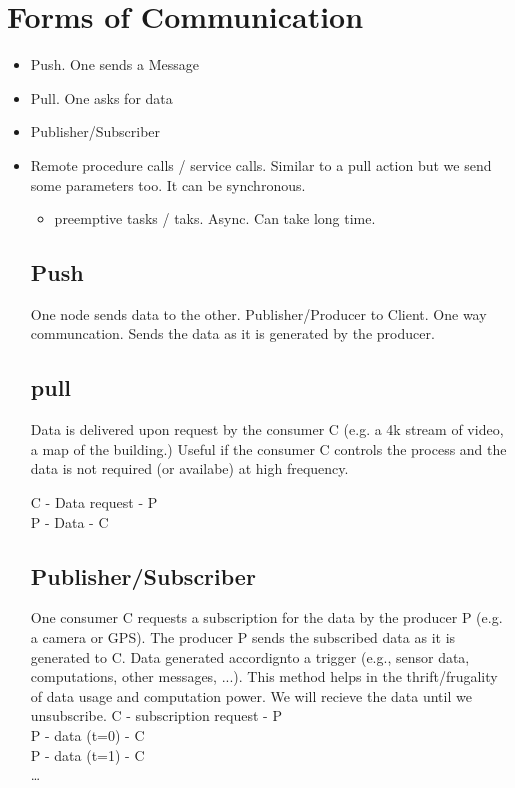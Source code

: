 \documentclass[]{report}
\begin{document}
\section*{Forms of Communication}
    \begin{itemize}
        \item Push. One sends a Message
        \item Pull. One asks for data
        \item Publisher/Subscriber
        \item Remote procedure calls / service calls. Similar to a pull action but we send some parameters too. It can be synchronous.
        \begin{itemize}
            \item  preemptive tasks / taks. Async. Can take long time.
        \end{itemize}
        \subsection*{Push}
        One node sends data to the other. Publisher/Producer to Client. One way communcation. Sends the data as it is generated by the producer.
        \subsection*{pull}
        Data is delivered upon request by the consumer C (e.g. a 4k stream of video, a map of the building.)
        Useful if the consumer C controls the process and the data is not required (or availabe) at high frequency.

        C - Data request - P \\
        P - Data - C

        \subsection*{Publisher/Subscriber}
        One consumer C requests a subscription for the data by the producer P (e.g. a camera or GPS). The producer P sends the subscribed data as it is generated to C.
        Data generated accordignto a trigger (e.g., sensor data, computations, other messages, ...). This method helps in the thrift/frugality of data usage and computation power.
        We will recieve the data until we unsubscribe.
        C - subscription request - P \\
        P - data (t=0) - C \\
        P - data (t=1) - C \\
        \dots


\end{itemize}
\end{document}
